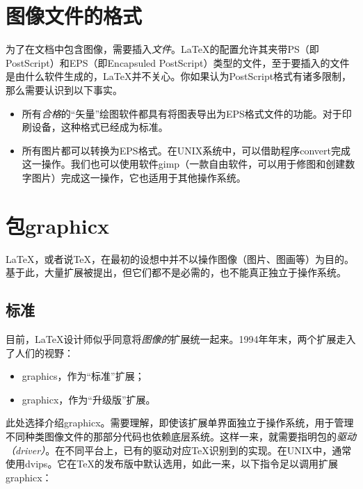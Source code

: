 \section{图像文件的格式}

为了在文档中包含图像，需要插入\emph{文件}。\LaTeX 的配置允许其夹带PS（即PostScript）和EPS（即Encapsuled PostScript）类型的文件，至于要插入的文件是由什么软件生成的，\LaTeX 并不关心。你如果认为PostScript格式有诸多限制，那么需要认识到以下事实。

\begin{itemize}
    \item 所有\emph{合格}的“矢量”绘图软件都具有将图表导出为EPS格式文件的功能。对于印刷设备，这种格式已经成为标准。
    \item 所有图片都可以转换为EPS格式。在UNIX系统中，可以借助程序\textsf{convert}完成这一操作。我们也可以使用软件\textsf{gimp}（一款自由软件，可以用于修图和创建数字图片）完成这一操作，它也适用于其他操作系统。
\end{itemize}

\section{包\textsf{graphicx}}

\LaTeX ，或者说\TeX ，在最初的设想中并不以操作图像（图片、图画等）为目的。基于此，大量扩展被提出，但它们都不是必需的，也不能真正独立于操作系统。

\subsection{标准}

目前，\LaTeX 设计师似乎同意将\emph{图像的}扩展统一起来。1994年年末，两个扩展走入了人们的视野：

\begin{itemize}
    \item \textsf{graphics}，作为“标准”扩展；
    \item \textsf{graphicx}，作为“升级版”扩展。
\end{itemize}

此处选择介绍\textsf{graphicx}。需要理解，即使该扩展单界面独立于操作系统，用于管理不同种类图像文件的那部分代码也依赖底层系统。这样一来，就需要指明包的\emph{驱动（driver）}。在不同平台上，已有的驱动对应\TeX 识别到的实现。在UNIX中，通常使用\textsf{dvips}。它在\TeX 的发布版中默认选用，如此一来，以下指令足以调用扩展\textsf{graphicx}：

